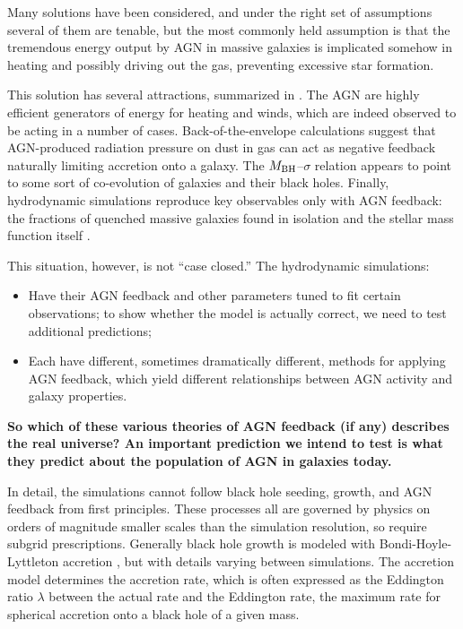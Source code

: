 \documentclass[12pt, preprint]{hacked-aastex}
\begin{document}
Many solutions have been considered, and under the right set of assumptions
several of them are tenable, but the most commonly held assumption is that
the tremendous energy output by AGN in massive galaxies is implicated somehow
in heating and possibly driving out the gas, preventing excessive star formation.

This solution has several attractions, summarized in \cite{fabian12}. The AGN 
are highly efficient generators
of energy for heating and winds, which are indeed observed to be acting in a 
number of cases. Back-of-the-envelope calculations suggest that 
AGN-produced
radiation pressure on dust in gas can act as negative feedback naturally limiting
accretion onto a galaxy. The $M_{\rm BH}$--$\sigma$ relation appears to point
to some sort of co-evolution of galaxies and their black holes. Finally, 
hydrodynamic simulations reproduce key observables only with AGN feedback: 
the fractions of  quenched massive galaxies found in isolation and the stellar 
mass function  itself \cite{somerville15a, wellons22a}.

This situation, however, is not ``case closed.'' The hydrodynamic simulations:
\begin{itemize}
\item Have their AGN feedback and other parameters tuned to fit
certain observations; to show whether the model is actually correct, we need to 
test additional predictions;
\item Each have different, sometimes dramatically different, methods for applying
AGN feedback, which yield different relationships between AGN activity and 
galaxy properties. 
\end{itemize}
{\bf So which of these various theories of AGN feedback (if any) describes
the real universe? An important prediction we intend to test is what they 
predict about the population of AGN in galaxies today.}

In detail, the simulations cannot follow black hole seeding, growth, and AGN feedback
from first principles. These processes all are governed by physics
on orders of magnitude smaller scales than the simulation resolution, so
require subgrid prescriptions.
Generally black hole growth is modeled with 
Bondi-Hoyle-Lyttleton accretion \cite{edgar04a}, but with details varying 
between simulations. The accretion model determines the accretion rate, 
which is often expressed as the Eddington ratio $\lambda$ between 
the actual rate and the Eddington rate, the maximum rate for spherical accretion 
onto a black hole of a given mass.
\end{document}
